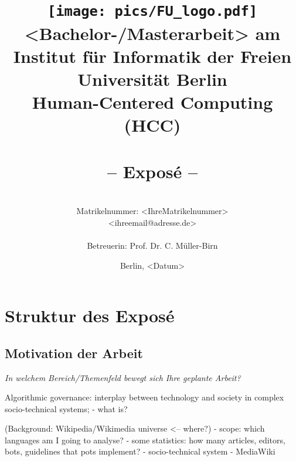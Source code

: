 \documentclass[pdftex,a4paper,11pt]{scrartcl}
\title{\texttt{[image: pics/FU\_logo.pdf]}\\
{\small <Bachelor-/Masterarbeit> am Institut für Informatik der Freien Universität Berlin}\\
{\small Human-Centered Computing (HCC)}\\
[6ex]
{\LARGE<Titel der Arbeit>}\\
{\normalsize-- Exposé --}}
\author{
{\emph{\normalsize<Ihr Vor- und Nachname>}}\\
{\normalsize Matrikelnummer: <IhreMatrikelnummer>}\\
{\normalsize <ihreemail@adresse.de>}\\\\
{\normalsize Betreuerin: Prof. Dr. C. Müller-Birn}
}
\date{\normalsize Berlin, <Datum>}
\newcommand{\blankpage}{
\newpage
\thispagestyle{empty}
\mbox{}
\newpage
}
\begin{document}
\maketitle

\thispagestyle{empty}  %

\blankpage


\setcounter{page}{1} %

\section{Struktur des Exposé}
\begin{comment}
Im Folgenden habe ich Ihnen eine generelle Struktur für ein Exposé vorgegeben. Jeder Abschnitt wird mit Fragen eingeleitet, welchen den Inhalt des Abschnitts abdecken. Ich gebe Ihnen, wenn erforderlich, noch einige Erläuterungen. Bitte beachten Sie, dass das Layout dieser Vorlage doppelseitig angelegt ist und daher auch der Ausdruck doppelseitig erfolgen sollte. Zur Erinnerung: ein Exposé umfasst ungefähr sechs bis zehn Seiten abhängig vom Thema. Der Inhalt des Exposé bildet dann das Grundgerüst für die schriftliche Ausarbeitung Ihrer Masterarbeit. Erst nach Abnahme des Exposé sollten Sie Ihre Masterarbeit anmelden.
\end{comment}

\subsection{Motivation der Arbeit}
\noindent \emph{In welchem Bereich/Themenfeld bewegt sich Ihre geplante Arbeit? }

Algorithmic governance: interplay between technology and society in complex socio-technical systems;
- what is?

(Background: Wikipedia/Wikimedia universe <-- where?)
- scope: which languages am I going to analyse?
- some statistics: how many articles, editors, bots, guidelines that pots
  implement?
- socio-technical system
- MediaWiki

\begin{comment}
\begin{itemize}
	\item Erläutern Sie kurz, in welchem Themenbereich Ihre Arbeit angesiedelt ist. Wo werden Sie einen Beitrag leisten?
	\item Das Ziel sollte es sein, den groben Kontext Ihrer Arbeit darzustellen.
\end{itemize}
\end{comment}
\end{document}
